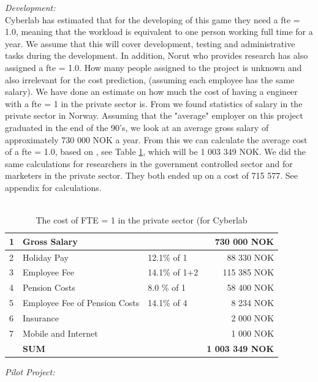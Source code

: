 \emph{Development:}\\
Cyberlab has estimated that for the developing of this game they need a \ac{fte} = 1.0, meaning that the workload is equivalent to one person working full time for a year. We assume that this will cover development, testing and administrative tasks during the development. In addition, Norut who provides research has also assigned a \ac{fte} = 1.0. How many people assigned to the project is unknown and also irrelevant for the cost prediction, (assuming each employee has the same salary). We have done an estimate on how much the cost of having a engineer with a \ac{fte} = 1 in the private sector is. From \cite{tekna} we found statistics of salary in the private sector in Norway. Assuming that the "average" employer on this project graduated in the end of the 90's, we look at an average gross salary of approximately 730 000 NOK a year. From this we can calculate the average cost of a \ac{fte} = 1.0, based on \cite{altinn}, see Table \ref{tab:costofFTE}, which will be 1 003 349 NOK. We did the same calculations for researchers in the government controlled sector and for marketers in the private sector. They both ended up on a cost of 715 577. See appendix for calculations.\\ \\
\begin{table}
\centering
    \begin{tabular}{|l|l|l|r|}
        \hline
       1&Gross Salary & & 730 000 NOK \\ \hline
       2&Holiday Pay & 12.1\% of 1  & 88 330 NOK \\ \hline
	   3&Employee Fee & 14.1\% of 1+2  & 115 385 NOK \\ \hline
	   4&Pension Costs & 8.0 \% of 1 & 58 400 NOK\\ \hline
	   5&Employee Fee of Pension Costs & 14.1\% of 4 & 8 234 NOK \\ \hline
	   6&Insurance & & 2 000 NOK \\ \hline
	   7&Mobile and Internet & & 1 000 NOK \\ \hline
	   & \textbf{SUM} & & \textbf{1 003 349 NOK} \\
	    \hline
    \end{tabular}
    \caption[Cost of FTE = 1]{The cost of FTE = 1 in the private sector (for Cyberlab}
    \label{tab:costofFTE}
\end{table}
\emph{Pilot Project:}\\
